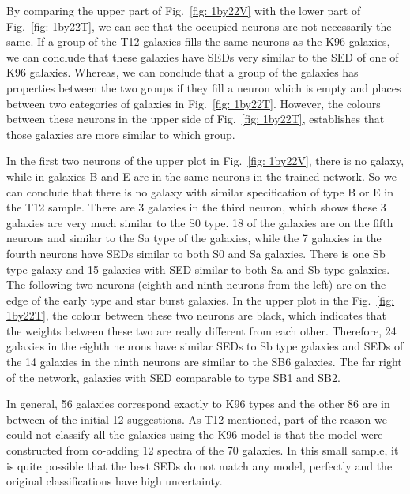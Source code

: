             By comparing the upper part of Fig.~\ref{fig: 1by22V} with the lower part of Fig.~\ref{fig: 1by22T}, we can see that the occupied neurons are not necessarily the same.
            If a group of the T12 galaxies fills the same neurons as the K96 galaxies, we can conclude that these galaxies have SEDs very similar to the SED of one of K96 galaxies.
            Whereas, we can conclude that a group of the galaxies has properties between the two groups if they fill a neuron which is empty and places between two categories of galaxies in Fig.~\ref{fig: 1by22T}.
            However, the colours between these neurons in the upper side of Fig.~\ref{fig: 1by22T}, establishes that those galaxies are more similar to which group. 
            
            In the first two neurons of the upper plot in Fig.~\ref{fig: 1by22V}, there is no galaxy, while in galaxies B and E are in the same neurons in the trained network.
            So we can conclude that there is no galaxy with similar specification of type B or E in the T12 sample.
            There are 3 galaxies in the third neuron, which shows these 3 galaxies are very much similar to the S0 type. 
            18 of the galaxies are on the fifth neurons and similar to the Sa type of the galaxies, while the 7 galaxies in the fourth neurons have SEDs similar to both S0 and Sa galaxies.
            There is one Sb type galaxy and 15 galaxies with SED similar to both Sa and Sb type galaxies.
            The following two neurons (eighth and ninth neurons from the left) are on the edge of the early type and star burst galaxies.
            In the upper plot in the  Fig.~\ref{fig: 1by22T}, the colour between these two neurons are black, which indicates that the weights between these two are really different from each other.
            Therefore, 24 galaxies in the eighth neurons have similar SEDs to Sb type galaxies and SEDs of the 14 galaxies in the ninth neurons are similar to the SB6 galaxies.
            The far right of the network, galaxies with SED comparable to type SB1 and SB2.
            
            In general, 56 galaxies correspond exactly to K96 types and the other 86 are in between of the initial 12 suggestions.
            As T12 mentioned, part of the reason we could not classify all the galaxies using the K96 model is that the model were constructed from co-adding 12 spectra of the 70 galaxies.
            In this small sample, it is quite possible that the best SEDs do not match any model, perfectly and the original classifications have high uncertainty.
            
